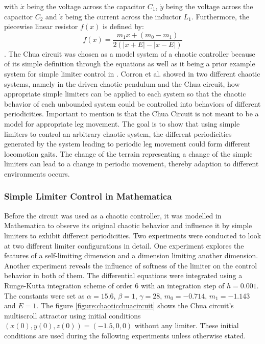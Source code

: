 \documentclass[main]{subfiles}
\begin{document}
with \(\dot{x}\) being the voltage across the capacitor \(C_1\), \(\dot{y}\) being the voltage across the capacitor \(C_2\) and \(\dot{z}\) being the current across the inductor \(L_1\).
%
Furthermore, the piecewise linear resistor \(f(x)\) is defined by:
%
\[f (x) = \frac{m_1 x + (m_0 - m_1)}{2 (| x + E | -| x - E |)}\].
%
The Chua circuit was chosen as a model system of a chaotic controller because of its simple definition through the equations as well as it being a prior example system for simple limiter control in \cite{bib:Corron2000}. %
%
Corron et al. showed in two different chaotic systems, namely in the driven chaotic pendulum and the Chua circuit, how appropriate simple limiters can be applied to each system so that the chaotic behavior of each unbounded system could be controlled into behaviors of different periodicities. %
%
Important to mention is that the Chua Circuit is not meant to be a model for appropriate leg movement. %
%
The goal is to show that using simple limiters to control an arbitrary chaotic system, the different periodicities generated by the system leading to periodic leg movement could form different locomotion gaits. %
%
The change of the terrain representing a change of the simple limiters can lead to a change in periodic movement, thereby adaption to different environments occurs. 

\subsubsection{Simple Limiter Control in Mathematica}
\label{subsubsec:simple-limiter-mathematica}

Before the circuit was used as a chaotic controller, it was modelled in Mathematica to observe its original chaotic behavior and influence it by simple limiters to exhibit different periodicities. %
%
Two experiments were conducted to look at two different limiter configurations in detail. %
%
One experiment explores the features of a self-limiting dimension and a dimension limiting another dimension. %
%
Another experiment reveals the influence of softness of the limiter on the control behavior in both of them. %
%
The differential equations were integrated using a Runge-Kutta integration scheme of order 6 with an integration step of \(h=0.001\). %
%
The constants were set as \(\alpha = 15.6\), \(\beta = 1\), \(\gamma = 28\), \(m_0 = -0.714\), \(m_1 = -1.143\) and \(E = 1\). %
%
The figure \ref{figure:chaoticchuacircuit} shows the Chua circuit's multiscroll attractor using initial conditions \((x(0),y(0),z(0)) = (-1.5,0,0)\) without any limiter. %
%
These initial conditions are used during the following experiments unless otherwise stated.
\end{document}
